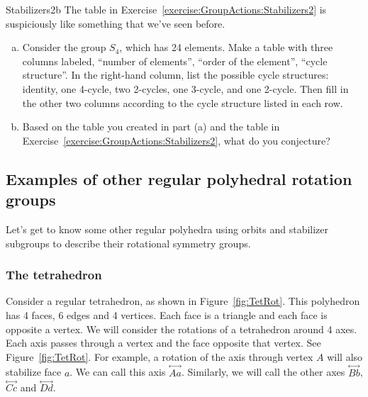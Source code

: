\begin{exercise}{Stabilizers2b}
The table in Exercise~\ref{exercise:GroupActions:Stabilizers2} is suspiciously like something that we've seen before.
\begin{enumerate}[(a)]
\item
Consider the group $S_4$, which has 24 elements. Make a table with three columns labeled, ``number of elements'', ``order of the element'', ``cycle structure''.  In the right-hand column, list the possible cycle structures: identity, one 4-cycle, two 2-cycles, one 3-cycle, and one 2-cycle. Then fill in the other two columns according to the cycle structure listed in each row.
\item Based on the table you created in part (a) and the table in Exercise~\ref{exercise:GroupActions:Stabilizers2}, what do you conjecture?
\end{enumerate}
\end{exercise}

\subsection{Examples of other regular polyhedral rotation groups}
\label{subsec:GroupActions:SymmetryOfPolyhedra:RegularPolyhedralRotaionGroup}

Let's get to know some other regular polyhedra using orbits and stabilizer subgroups to describe their rotational symmetry groups.

\subsubsection*{The tetrahedron}
\label{subsec:GroupActions:SymmetryOfPolyhedra:Tetrahedron}

Consider a regular tetrahedron, as shown in Figure~\ref{fig:TetRot}. This polyhedron has 4 faces, 6 edges and 4 vertices.  Each face is a triangle and each face is opposite a vertex. We will consider the rotations of a tetrahedron around 4 axes.  Each axis passes through a vertex and the face opposite that vertex. See Figure~\ref{fig:TetRot}. For example, a rotation of the axis through vertex $A$ will also stabilize face $a$.  We can call this axis $\overset{\leftrightarrow}{Aa}$.  Similarly, we will call the other axes $\overset{\leftrightarrow}{Bb}$, $\overset{\leftrightarrow}{Cc}$ and $\overset{\leftrightarrow}{Dd}$.

